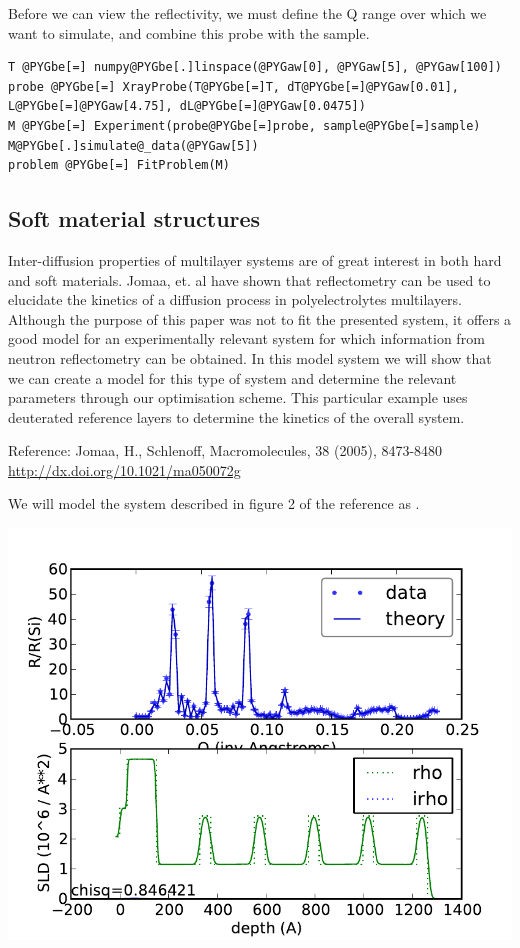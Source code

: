 \documentclass[letterpaper,10pt,english]{sphinxmanual}
\begin{document}
Before we can view the reflectivity, we must define the Q range over
which we want to simulate, and combine this probe with the sample.

\begin{Verbatim}[commandchars=@\[\]]
T @PYGbe[=] numpy@PYGbe[.]linspace(@PYGaw[0], @PYGaw[5], @PYGaw[100])
probe @PYGbe[=] XrayProbe(T@PYGbe[=]T, dT@PYGbe[=]@PYGaw[0.01], L@PYGbe[=]@PYGaw[4.75], dL@PYGbe[=]@PYGaw[0.0475])
M @PYGbe[=] Experiment(probe@PYGbe[=]probe, sample@PYGbe[=]sample)
M@PYGbe[.]simulate@_data(@PYGaw[5])
problem @PYGbe[=] FitProblem(M)
\end{Verbatim}


\subsection{Soft material structures}
\label{examples/superlattice/PEMU:soft-material-structures}\label{examples/superlattice/PEMU::doc}
Inter-diffusion properties of multilayer systems are of great interest in both
hard and soft materials. Jomaa, et. al  have shown that reflectometry can be
used to elucidate the kinetics of a diffusion process in polyelectrolytes
multilayers. Although the purpose of this paper was not to fit the presented
system, it offers a good model for an experimentally relevant system for which
information from neutron reflectometry can be obtained. In this model system
we will show that we can create a model for this type of system and determine
the relevant parameters through our optimisation scheme. This particular
example uses deuterated reference layers to determine the kinetics of the
overall system.

Reference: Jomaa, H., Schlenoff, Macromolecules, 38 (2005), 8473-8480
\href{http://dx.doi.org/10.1021/ma050072g}{http://dx.doi.org/10.1021/ma050072g}

We will model the system described in figure 2 of the reference as
.

\includegraphics{a6b48bc7a5.pdf}
\end{document}
